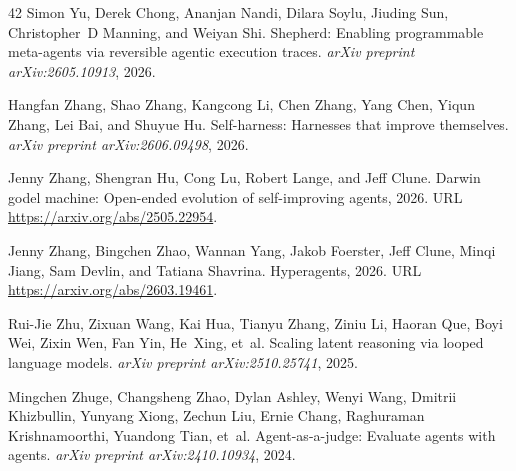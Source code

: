 \begin{thebibliography}{42}
Simon Yu, Derek Chong, Ananjan Nandi, Dilara Soylu, Jiuding Sun, Christopher~D Manning, and Weiyan Shi.
\newblock Shepherd: Enabling programmable meta-agents via reversible agentic execution traces.
\newblock \emph{arXiv preprint arXiv:2605.10913}, 2026.

Hangfan Zhang, Shao Zhang, Kangcong Li, Chen Zhang, Yang Chen, Yiqun Zhang, Lei Bai, and Shuyue Hu.
\newblock Self-harness: Harnesses that improve themselves.
\newblock \emph{arXiv preprint arXiv:2606.09498}, 2026{}.

Jenny Zhang, Shengran Hu, Cong Lu, Robert Lange, and Jeff Clune.
\newblock Darwin godel machine: Open-ended evolution of self-improving agents, 2026{}.
\newblock URL \url{https://arxiv.org/abs/2505.22954}.

Jenny Zhang, Bingchen Zhao, Wannan Yang, Jakob Foerster, Jeff Clune, Minqi Jiang, Sam Devlin, and Tatiana Shavrina.
\newblock Hyperagents, 2026{}.
\newblock URL \url{https://arxiv.org/abs/2603.19461}.

Rui-Jie Zhu, Zixuan Wang, Kai Hua, Tianyu Zhang, Ziniu Li, Haoran Que, Boyi Wei, Zixin Wen, Fan Yin, He~Xing, et~al.
\newblock Scaling latent reasoning via looped language models.
\newblock \emph{arXiv preprint arXiv:2510.25741}, 2025.

Mingchen Zhuge, Changsheng Zhao, Dylan Ashley, Wenyi Wang, Dmitrii Khizbullin, Yunyang Xiong, Zechun Liu, Ernie Chang, Raghuraman Krishnamoorthi, Yuandong Tian, et~al.
\newblock Agent-as-a-judge: Evaluate agents with agents.
\newblock \emph{arXiv preprint arXiv:2410.10934}, 2024.

\end{thebibliography}
